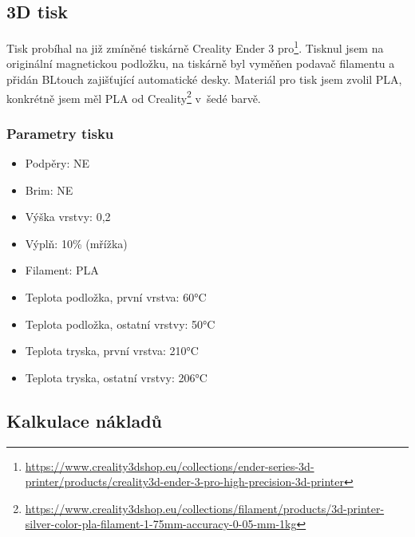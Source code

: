 \documentclass[11pt,a4paper,twoside,openright]{report}
\begin{document}
	\subsection{3D tisk}
	
	Tisk probíhal na již zmíněné tiskárně Creality Ender 3 pro\footnote{\url{https://www.creality3dshop.eu/collections/ender-series-3d-printer/products/creality3d-ender-3-pro-high-precision-3d-printer}}. Tisknul jsem na originální magnetickou podložku, na tiskárně byl vyměňen podavač filamentu a přidán BLtouch zajišťující automatické  desky. Materiál pro tisk jsem zvolil PLA, konkrétně jsem měl PLA od Creality\footnote{\url{https://www.creality3dshop.eu/collections/filament/products/3d-printer-silver-color-pla-filament-1-75mm-accuracy-0-05-mm-1kg}} v~šedé barvě.
	
	\subsubsection{Parametry tisku}
	\begin{itemize}
		\item Podpěry: NE
		\item Brim: NE
		\item Výška vrstvy: 0,2
		\item Výplň: 10\% (mřížka)
		\item Filament: PLA
		\item Teplota podložka, první vrstva: 60°C
		\item Teplota podložka, ostatní vrstvy: 50°C
		\item Teplota tryska, první vrstva: 210°C
		\item Teplota tryska, ostatní vrstvy: 206°C
	\end{itemize}
	
	\subsection{Kalkulace nákladů}
	
\end{document}
